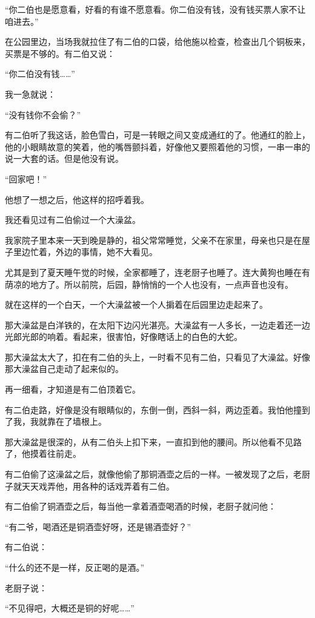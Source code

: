 \par “你二伯也是愿意看，好看的有谁不愿意看。你二伯没有钱，没有钱买票人家不让咱进去。”
\par 在公园里边，当场我就拉住了有二伯的口袋，给他施以检查，检查出几个铜板来，买票是不够的。有二伯又说：
\par “你二伯没有钱……”
\par 我一急就说：
\par “没有钱你不会偷？”
\par 有二伯听了我这话，脸色雪白，可是一转眼之间又变成通红的了。他通红的脸上，他的小眼睛故意的笑着，他的嘴唇颤抖着，好像他又要照着他的习惯，一串一串的说一大套的话。但是他没有说。
\par “回家吧！”
\par 他想了一想之后，他这样的招呼着我。
\par 我还看见过有二伯偷过一个大澡盆。
\par 我家院子里本来一天到晚是静的，祖父常常睡觉，父亲不在家里，母亲也只是在屋子里边忙着，外边的事情，她不大看见。
\par 尤其是到了夏天睡午觉的时候，全家都睡了，连老厨子也睡了。连大黄狗也睡在有荫凉的地方了。所以前院，后园，静悄悄的一个人也没有，一点声音也没有。
\par 就在这样的一个白天，一个大澡盆被一个人掮着在后园里边走起来了。
\par 那大澡盆是白洋铁的，在太阳下边闪光湛亮。大澡盆有一人多长，一边走着还一边光郎光郎的响着。看起来，很害怕，好像瞎话上的白色的大蛇。
\par 那大澡盆太大了，扣在有二伯的头上，一时看不见有二伯，只看见了大澡盆。好像那大澡盆自己走动了起来似的。
\par 再一细看，才知道是有二伯顶着它。
\par 有二伯走路，好像是没有眼睛似的，东倒一倒，西斜一斜，两边歪着。我怕他撞到了我，我就靠在了墙根上。
\par 那大澡盆是很深的，从有二伯头上扣下来，一直扣到他的腰间。所以他看不见路了，他摸着往前走。
\par 有二伯偷了这澡盆之后，就像他偷了那铜酒壶之后的一样。一被发现了之后，老厨子就天天戏弄他，用各种的话戏弄着有二伯。
\par 有二伯偷了铜酒壶之后，每当他一拿着酒壶喝酒的时候，老厨子就问他：
\par “有二爷，喝酒还是铜酒壶好呀，还是锡酒壶好？”
\par 有二伯说：
\par “什么的还不是一样，反正喝的是酒。”
\par 老厨子说：
\par “不见得吧，大概还是铜的好呢……”
